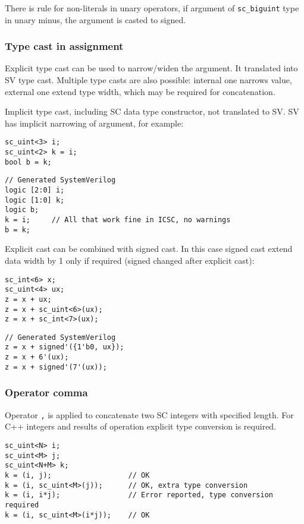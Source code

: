 There is rule for non-literals in unary operators, if argument of {\tt sc\_biguint} type in unary minus, the argument is casted to signed.

\subsubsection{Type cast in assignment}

Explicit type cast can be used to narrow/widen the argument. It translated into SV type cast. Multiple type casts are also possible: internal one narrows value, external one extend type width, which may be required for concatenation. 

Implicit type cast, including SC data type constructor, not translated to SV. SV has implicit narrowing of argument, for example:
%
\begin{lstlisting}[style=mycpp]
sc_uint<3> i;
sc_uint<2> k = i;
bool b = k;
\end{lstlisting}
%
\begin{lstlisting}[style=myverilog]
// Generated SystemVerilog
logic [2:0] i;
logic [1:0] k;
logic b;
k = i;     // All that work fine in ICSC, no warnings
b = k;     
\end{lstlisting}

Explicit cast can be combined with signed cast. In this case signed cast extend data width by 1 only if required (signed changed after explicit cast):
%
\begin{lstlisting}[style=mycpp]
sc_int<6> x;
sc_uint<4> ux;
z = x + ux;
z = x + sc_uint<6>(ux);
z = x + sc_int<7>(ux);
\end{lstlisting}
%
\begin{lstlisting}[style=myverilog]
// Generated SystemVerilog
z = x + signed'({1'b0, ux});
z = x + 6'(ux);
z = x + signed'(7'(ux));
\end{lstlisting}

\subsubsection{Operator comma}

Operator {\tt ,} is applied to concatenate two SC integers with specified length. For C++ integers and results of operation explicit type conversion is required.
%
\begin{lstlisting}[style=mycpp]
sc_uint<N> i; 
sc_uint<M> j; 
sc_uint<N+M> k;
k = (i, j);                  // OK 
k = (i, sc_uint<M>(j));      // OK, extra type conversion
k = (i, i*j);                // Error reported, type conversion required
k = (i, sc_uint<M>(i*j));    // OK
\end{lstlisting}





